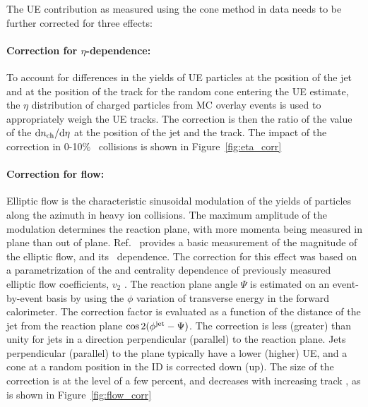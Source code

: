 The UE contribution as measured using the cone method in data needs to be further corrected for three effects:

\paragraph{Correction for $\eta$-dependence:}
To account for differences in the yields of UE particles at the position of the jet and at the position of the track for the random cone entering the UE estimate, the $\eta$ distribution of charged particles from MC overlay events is used to appropriately weigh the UE tracks.
The correction is then the ratio of the value of the $\mathrm{d} \mbox{$n_{\mathrm{ch}}$} / \mathrm{d}\eta$ at the position of the jet and the track.
The impact of the correction in 0-10\% \pbpb\ collisions is shown in Figure~\ref{fig:eta_corr}



\paragraph{Correction for flow:}
Elliptic flow is the characteristic sinusoidal modulation of the yields of particles along the azimuth in heavy ion collisions.
The maximum amplitude of the modulation determines the reaction plane, with more momenta being measured in plane than out of plane.
Ref.~\cite{Aaboud:2018ves} provides a basic measurement of the magnitude of the elliptic flow, and its \pt\ dependence.
The correction for this effect was based on a parametrization of the \pTch and centrality dependence of previously measured elliptic flow coefficients, $v_{2}$ \cite{Aaboud:2018ves}.
The reaction plane angle $\Psi$ is estimated on an event-by-event basis by using the $\phi$ variation of transverse energy in the forward calorimeter.
The correction factor is evaluated as a function of the distance of the jet from the reaction plane $\cos2(\mbox{$\phi^{\mathrm{jet}}$} - \Psi)$.
The correction is less (greater) than unity for jets in a direction perpendicular (parallel) to the reaction plane.
Jets perpendicular (parallel) to the plane typically have a lower (higher) UE, and a cone at a random position in the ID is corrected down (up).
The size of the correction is at the level of a few percent, and decreases with increasing track \pt, as is shown in Figure~\ref{fig:flow_corr}



